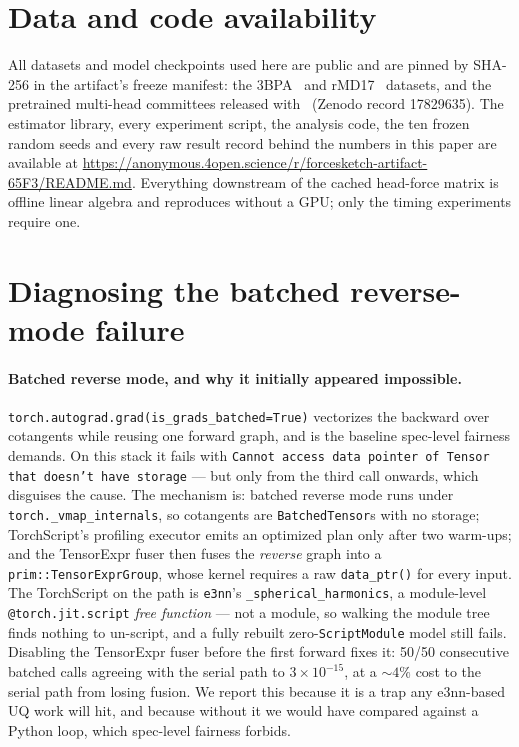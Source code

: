 \documentclass{article}
\newcommand{\fsCodeUrl}{https://anonymous.4open.science/r/forcesketch-artifact-65F3/README.md}
\begin{document}
\section*{Data and code availability}
All datasets and model checkpoints used here are public and are pinned by SHA-256 in the artifact's
freeze manifest: the 3BPA~\citep{botnet3bpa} and rMD17~\citep{rmd17} datasets, and the pretrained
multi-head committees released with~\citet{beck2025mhc} (Zenodo record 17829635). The estimator
library, every experiment script, the analysis code, the ten frozen random seeds and every raw
result record behind the numbers in this paper are available at
\url{\fsCodeUrl}. Everything downstream of the cached head-force matrix is offline linear algebra
and reproduces without a GPU; only the timing experiments require one.




\appendix

\section{Diagnosing the batched reverse-mode failure}
\label{app:tensorexpr}
\paragraph{Batched reverse mode, and why it initially appeared impossible.}
\texttt{torch.autograd.grad(is\_grads\_batched=True)} vectorizes the backward over cotangents while
reusing one forward graph, and is the baseline spec-level fairness demands. On this stack it fails
with \texttt{Cannot access data pointer of Tensor that doesn't have storage} --- but only from the
third call onwards, which disguises the cause. The mechanism is: batched reverse mode runs under
\texttt{torch.\_vmap\_internals}, so cotangents are \texttt{BatchedTensor}s with no storage;
TorchScript's profiling executor emits an optimized plan only after two warm-ups; and the TensorExpr
fuser then fuses the \emph{reverse} graph into a \texttt{prim::TensorExprGroup}, whose kernel
requires a raw \texttt{data\_ptr()} for every input. The TorchScript on the path is
\texttt{e3nn}'s \texttt{\_spherical\_harmonics}, a module-level \texttt{@torch.jit.script}
\emph{free function} --- not a module, so walking the module tree finds nothing to un-script, and a
fully rebuilt zero-\texttt{ScriptModule} model still fails. Disabling the TensorExpr fuser before
the first forward fixes it: 50/50 consecutive batched calls agreeing with the serial path to
$3\times10^{-15}$, at a $\sim\!4\%$ cost to the serial path from losing fusion. We report this
because it is a trap any e3nn-based UQ work will hit, and because without it we would have compared
against a Python loop, which spec-level fairness forbids.
\end{document}
